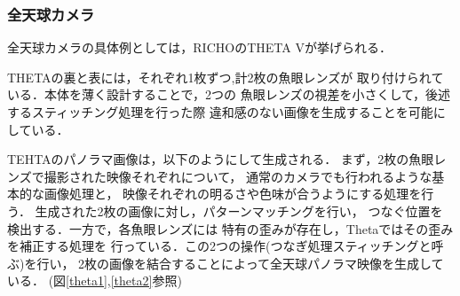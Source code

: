 \subsubsection*{全天球カメラ}

全天球カメラの具体例としては，RICHOのTHETA V\cite{4}が挙げられる．

THETAの裏と表には，それぞれ1枚ずつ,計2枚の魚眼レンズが
取り付けられている．本体を薄く設計することで，2つの
魚眼レンズの視差を小さくして，後述するスティッチング処理を行った際
違和感のない画像を生成することを可能にしている．

TEHTAのパノラマ画像は，以下のようにして生成される．
まず，2枚の魚眼レンズで撮影された映像それぞれについて，
通常のカメラでも行われるような基本的な画像処理と，
映像それぞれの明るさや色味が合うようにする処理を行う．
生成された2枚の画像に対し，パターンマッチングを行い，
つなぐ位置を検出する．一方で，各魚眼レンズには
特有の歪みが存在し，Thetaではその歪みを補正する処理を
行っている．この2つの操作(つなぎ処理スティッチングと呼ぶ)を行い，
2枚の画像を結合することによって全天球パノラマ映像を生成している．
(図\ref{theta1},\ref{theta2}参照)


